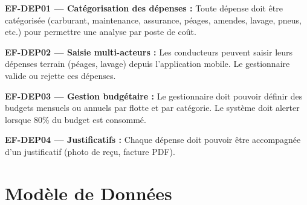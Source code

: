 \documentclass[12pt,a4paper]{report}
\begin{document}
\begin{reqbox}
\textbf{EF-DEP01 — Catégorisation des dépenses :} Toute dépense doit être catégorisée (carburant, maintenance, assurance, péages, amendes, lavage, pneus, etc.) pour permettre une analyse par poste de coût.
\end{reqbox}

\begin{reqbox}
\textbf{EF-DEP02 — Saisie multi-acteurs :} Les conducteurs peuvent saisir leurs dépenses terrain (péages, lavage) depuis l'application mobile. Le gestionnaire valide ou rejette ces dépenses.
\end{reqbox}

\begin{reqbox}
\textbf{EF-DEP03 — Gestion budgétaire :} Le gestionnaire doit pouvoir définir des budgets mensuels ou annuels par flotte et par catégorie. Le système doit alerter lorsque 80\% du budget est consommé.
\end{reqbox}

\begin{reqbox}
\textbf{EF-DEP04 — Justificatifs :} Chaque dépense doit pouvoir être accompagnée d'un justificatif (photo de reçu, facture PDF).
\end{reqbox}

\section{Modèle de Données}
\end{document}
